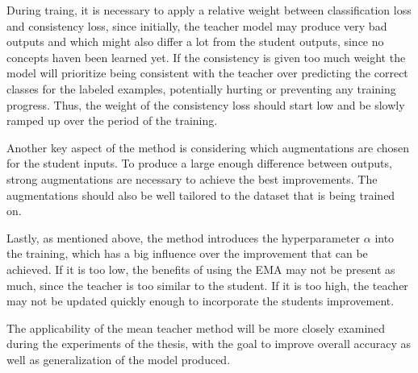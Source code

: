 During traing, it is necessary to apply a relative weight between classification loss and consistency loss, since initially, the teacher model may produce very bad outputs and which might also differ a lot from the student outputs, since no concepts haven been learned yet. 
If the consistency is given too much weight the model will prioritize being consistent with the teacher over predicting the correct classes for the labeled examples, potentially hurting or preventing any training progress. 
Thus, the weight of the consistency loss should start low and be slowly ramped up over the period of the training. 

Another key aspect of the method is considering which augmentations are chosen for the student inputs. To produce a large enough difference between outputs, strong augmentations are necessary to achieve the best improvements. The augmentations should also be well tailored to the dataset that is being trained on. 

Lastly, as mentioned above, the method introduces the hyperparameter $\alpha$ into the training, which has a big influence over the improvement that can be achieved. If it is too low, the benefits of using the EMA may not be present as much, since the teacher is too similar to the student. If it is too high, the teacher may not be updated quickly enough to incorporate the students improvement. 

The applicability of the mean teacher method will be more closely examined during the experiments of the thesis, with the goal to improve overall accuracy as well as generalization of the model produced. 